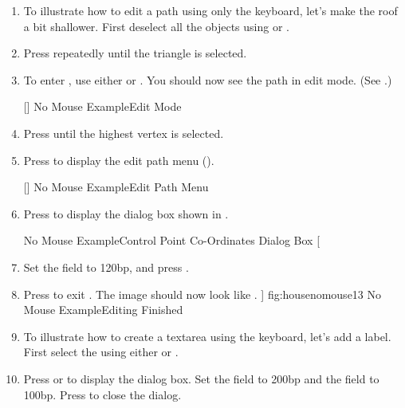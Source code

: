\begin{enumerate}
\item To illustrate how to edit a path using only the keyboard,
let's make the roof a bit shallower. First deselect all the objects
using  or .

\item Press  repeatedly until the triangle is selected.

\item To enter \editpathmode, use either  or
. You should now see the
path in edit mode. (See .)

[]
{}
{No Mouse Example\dash Edit Mode}

\item Press  until the highest vertex is selected.

\item Press  to display the edit path menu
().

[]
{}
{No Mouse Example\dash Edit Path Menu}

\item Press  to display the
 dialog box shown in .

{}
{No Mouse Example\dash Control Point Co-Ordinates Dialog Box}
[
  \item Set the  field to 120bp,
  and press .
  \item Press  to exit \editpathmode. The image should now
  look like .
]
{fig:housenomouse13}
{}
{No Mouse Example\dash Editing Finished}

\item To illustrate how to create a \gls{textarea} using
the keyboard, let's add a label. First select the
 using either  or 
.

\item Press  or  to display
the  dialog box. Set the
 field to 200bp and the
 field to 100bp.
Press  to close the dialog.


\end{enumerate}
